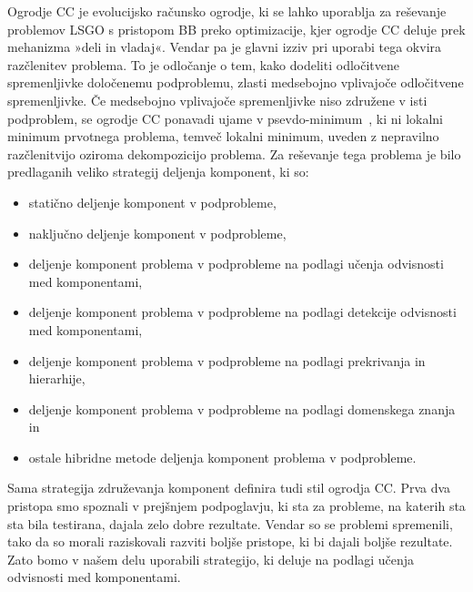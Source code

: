 Ogrodje CC je evolucijsko računsko ogrodje, ki se lahko uporablja za reševanje problemov LSGO s pristopom BB preko optimizacije, kjer ogrodje CC deluje prek mehanizma »deli in vladaj«.
Vendar pa je glavni izziv pri uporabi tega okvira razčlenitev problema.
To je odločanje o tem, kako dodeliti odločitvene spremenljivke določenemu podproblemu, zlasti medsebojno vplivajoče odločitvene spremenljivke.
Če medsebojno vplivajoče spremenljivke niso združene v isti podproblem, se ogrodje CC ponavadi ujame v psevdo-minimum~\cite{bib:psudo_min_cc}, ki ni lokalni minimum prvotnega problema, temveč lokalni minimum, uveden z nepravilno razčlenitvijo oziroma dekompozicijo problema.
Za reševanje tega problema je bilo predlaganih veliko strategij deljenja komponent, ki so:
\begin{itemize}
    \item statično deljenje komponent v podprobleme,
    \item naključno deljenje komponent v podprobleme,
    \item deljenje komponent problema v podprobleme na podlagi učenja odvisnosti med komponentami,
    \item deljenje komponent problema v podprobleme na podlagi detekcije odvisnosti med komponentami,
    \item deljenje komponent problema v podprobleme na podlagi prekrivanja in hierarhije,
    \item deljenje komponent problema v podprobleme na podlagi domenskega znanja in
    \item ostale hibridne metode deljenja komponent problema v podprobleme.
\end{itemize}
Sama strategija združevanja komponent definira tudi stil ogrodja CC.
Prva dva pristopa smo spoznali v prejšnjem podpoglavju, ki sta za probleme, na katerih sta sta bila testirana, dajala zelo dobre rezultate.
Vendar so se problemi spremenili, tako da so morali raziskovali razviti boljše pristope, ki bi dajali boljše rezultate.
Zato bomo v našem delu uporabili strategijo, ki deluje na podlagi učenja odvisnosti med komponentami.

